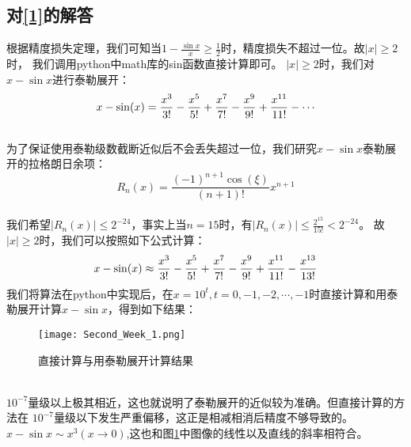 \documentclass[a4paper,11pt,openany,notitlepage]{book}
\begin{document}
\subsection{对\ref{1}的解答}
根据精度损失定理，我们可知当$1-\frac{\sin{x}}{x}\geq\frac{1}{2}$时，精度损失不超过一位。故$\left|x\right|\geq2$时，
我们调用python中math库的sin函数直接计算即可。
\indent$\left|x\right|\geq2$时，我们对$x-\sin{x}$进行泰勒展开：
\begin{equation}
    x-\sin(x) = \frac{x^3}{3!} - \frac{x^5}{5!} + \frac{x^7}{7!} - \frac{x^9}{9!} + \frac{x^{11}}{11!} - \cdots\notag
\end{equation}
\\为了保证使用泰勒级数截断近似后不会丢失超过一位，我们研究$x-\sin{x}$泰勒展开的拉格朗日余项：
\begin{equation}
    R_n(x) = \frac{(-1)^{n+1}\cos(\xi)}{(n+1)!}x^{n+1}
\end{equation}
\\我们希望$\left|R_n(x)\right|\leq2^{-24}$，事实上当$n=15$时，有$\left|R_n(x)\right|\leq\frac{2^{15}}{15!}<2^{-24}$。
故$\left|x\right|\geq2$时，我们可以按照如下公式计算：
\begin{equation}
    x-\sin(x) \approx \frac{x^3}{3!} - \frac{x^5}{5!} + \frac{x^7}{7!} - \frac{x^9}{9!} + \frac{x^{11}}{11!} - \frac{x^{13}}{13!}\notag
\end{equation}
我们将算法在python中实现后，在$x=10^{t},t=0,-1,-2,\cdots,-1$时直接计算和用泰勒展开计算$x-\sin{x}$，得到如下结果：
\begin{figure}[h]
    \centering
    \texttt{[image: Second\_Week\_1.png]}
    \caption{直接计算与用泰勒展开计算结果}
    \label{pic 3}
\end{figure}
\\$10^{-7}$量级以上极其相近，这也就说明了泰勒展开的近似较为准确。但直接计算的方法在
$10^{-7}$量级以下发生严重偏移，这正是相减相消后精度不够导致的。\\
$x-\sin{x} \sim x^{3}(x\rightarrow0)$,这也和图\ref{pic 3}中图像的线性以及直线的斜率相符合。
\end{document}
